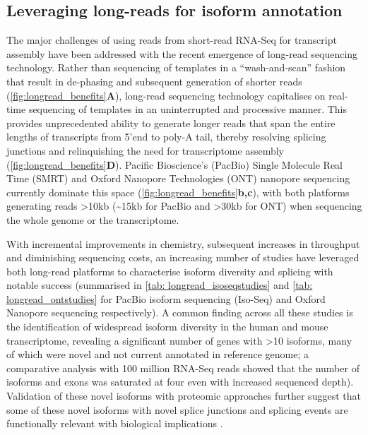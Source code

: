 \subsection{Leveraging long-reads for isoform annotation}
The major challenges of using reads from short-read RNA-Seq for transcript assembly have been addressed with the recent emergence of long-read sequencing technology. Rather than sequencing of templates in a “wash-and-scan” fashion that result in de-phasing and subsequent generation of shorter reads (\cref{fig:longread_benefits}\textbf{A}), long-read sequencing technology capitalises on real-time sequencing of templates in an uninterrupted and processive manner. This provides unprecedented ability to generate longer reads that span the entire lengths of transcripts from 5'end to poly-A tail, thereby resolving splicing junctions and relinquishing the need for transcriptome assembly (\cref{fig:longread_benefits}\textbf{D}). Pacific Bioscience's (PacBio) Single Molecule Real Time (SMRT) and Oxford Nanopore Technologies (ONT) nanopore sequencing currently dominate this space (\cref{fig:longread_benefits}\textbf{b,c}), with both platforms generating reads >10kb (\textasciitilde15kb for PacBio and >30kb for ONT) when sequencing the whole genome or the transcriptome.  

With incremental improvements in chemistry, subsequent increases in throughput and diminishing sequencing costs, an increasing number of studies have leveraged both long-read platforms to characterise isoform diversity and splicing with notable success (summarised in \cref{tab: longread_isoseqstudies} and \cref{tab: longread_ontstudies} for PacBio isoform sequencing (Iso-Seq) and Oxford Nanopore sequencing respectively). A common finding across all these studies is the identification of widespread isoform diversity in the human \cite{Sharon2013, Au2013,Tseng2019,DeslattesMays2019} and mouse transcriptome, revealing a significant number of genes with >10 isoforms, many of which were novel and not current annotated in reference genome; a comparative analysis with 100 million RNA-Seq reads showed that the number of isoforms and exons was saturated at four even with increased sequenced depth\cite{DeslattesMays2019}). Validation of these novel isoforms with proteomic approaches further suggest that some of these novel isoforms with novel splice junctions and splicing events are functionally relevant with biological implications \cite{Huang2021}. 

